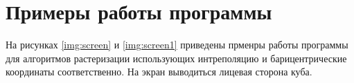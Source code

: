 \section{Примеры работы программы}
На рисунках \ref{img:screen} и \ref{img:screen1} приведены прменры работы программы для алгоритмов растеризации использующих интреполяцию и барицентрические координаты соответственно. На экран выводиться лицевая сторона куба.
\begin{center}
	\label{img:screen}
\end{center}
\begin{center}
	\label{img:screen1}
\end{center}

